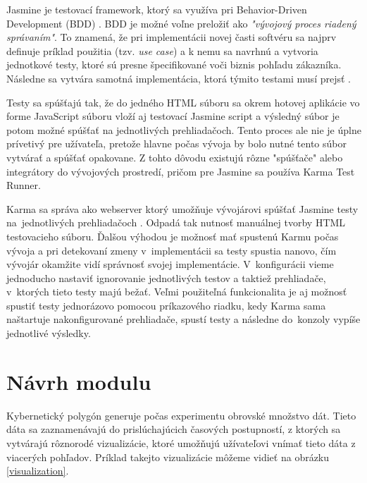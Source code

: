 \documentclass[
  digital, %
  twoside, %
  notable,   %
  nolof,   %
  nolot,   %
]{fithesis3}
\newcommand{\inquotes}[1]{{}"{}#1{}"{}}
\begin{document}
Jasmine je testovací framework, ktorý sa využíva pri Behavior-Driven Development (BDD) \cite{ragonha2013jasmine}. BDD je možné voľne preložiť ako \textit{"vývojový proces riadený správaním"}. To znamená, že pri implementácii novej časti softvéru sa najprv definuje príklad použitia (tzv. \textit{use case}) a k nemu sa navrhnú a vytvoria jednotkové testy, ktoré sú presne špecifikované voči biznis pohľadu zákazníka. Následne sa vytvára samotná implementácia, ktorá týmito testami musí prejsť \cite{nelson2013test}.

Testy sa spúšťajú tak, že do jedného HTML súboru sa okrem hotovej aplikácie vo forme JavaScript súboru vloží aj testovací Jasmine script a výsledný súbor je potom možné spúšťať na jednotlivých prehliadačoch. Tento proces ale nie je úplne prívetivý pre užívateľa, pretože hlavne počas vývoja by bolo nutné tento súbor vytvárať a spúšťať opakovane. Z tohto dôvodu existujú rôzne \inquotes{spúšťače} alebo integrátory do vývojových prostredí, pričom pre Jasmine sa používa Karma Test Runner.

Karma sa správa ako webserver ktorý umožňuje vývojárovi spúšťať Jasmine testy na~jednotlivých prehliadačoch \cite{karma}. Odpadá tak nutnosť manuálnej tvorby HTML testovacieho súboru. Ďalšou výhodou je možnosť mať spustenú Karmu počas vývoja a pri detekovaní zmeny v~implementácii sa testy spustia nanovo, čím vývojár okamžite vidí správnosť svojej implementácie. V~konfigurácii vieme jednoducho nastaviť ignorovanie jednotlivých testov a taktiež prehliadače, v~ktorých tieto testy majú bežať. Veľmi použiteľná funkcionalita je aj možnosť spustiť testy jednorázovo pomocou príkazového riadku, kedy Karma sama naštartuje nakonfigurované prehliadače, spustí testy a následne do~konzoly vypíše jednotlivé výsledky.

\chapter{Návrh modulu}
\label{plan}

Kybernetický polygón generuje počas experimentu obrovské množstvo dát. Tieto dáta sa zaznamenávajú do prislúchajúcich časových postupností, z ktorých sa vytvárajú rôznorodé vizualizácie, ktoré umožňujú užívateľovi vnímať tieto dáta z viacerých pohľadov. Príklad takejto vizualizácie môžeme vidieť na obrázku \ref{visualization}.
\end{document}
